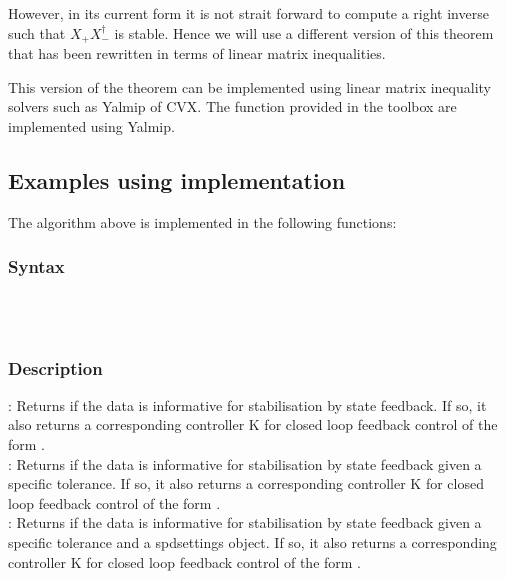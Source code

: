 However, in its current form it is not strait forward to compute a right inverse such that $X_+ X_-^\dagger$ is stable. Hence we will use a different version of this theorem that has been rewritten in terms of linear matrix inequalities.


This version of the theorem can be implemented using linear matrix inequality solvers such as Yalmip of CVX. The function provided in the toolbox are implemented using Yalmip.

\subsection{Examples using implementation}
The algorithm above is implemented in the following functions:
\subsubsection*{Syntax}
 \\
 \\

\subsubsection*{Description}
: Returns if the data is informative for stabilisation by state feedback. If so, it also returns a corresponding controller K for closed loop feedback control of the form .\\
: Returns if the data is informative for stabilisation by state feedback given a specific tolerance. If so, it also returns a corresponding controller K for closed loop feedback control of the form .\\
: Returns if the data is informative for stabilisation by state feedback given a specific tolerance and a spdsettings object. If so, it also returns a corresponding controller K for closed loop feedback control of the form .

